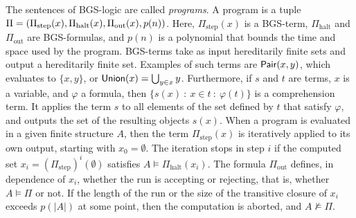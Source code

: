 \documentclass[a4paper,UKenglish,cleveref, autoref, thm-restate]{lipics-v2021}
\renewcommand{\phi}{\varphi}
\renewcommand{\phi}{\varphi}
\newcommand{\Pair}{\textsf{\upshape Pair}}
\newcommand{\Union}{\textsf{\upshape Union}}
\begin{document}
	The sentences of BGS-logic are called \emph{programs}. A program is a tuple $\Pi = (\Pi_{\text{step}}(x),\\ \Pi_{\text{halt}}(x),\Pi_{\text{out}}(x),p(n))$. Here, $\Pi_{\text{step}}(x)$ is a BGS-term, $\Pi_{\text{halt}}$ and $\Pi_{\text{out}}$ are BGS-formulas, and $p(n)$ is a polynomial that bounds the time and space used by the program. BGS-terms take as input hereditarily finite sets and output a hereditarily finite set. Examples of such terms are $\Pair(x,y)$, which evaluates to $\{x,y\}$, or $\Union(x) = \bigcup_{y \in x} y$. Furthermore, if $s$ and $t$ are terms, $x$ is a variable, and $\phi$ a formula, then $\{ s(x) \ : \ x \in t \ : \ \phi(t) \}$ is a comprehension term. It applies the term $s$ to all elements of the set defined by $t$ that satisfy $\phi$, and outputs the set of the resulting objects $s(x)$. When a program is evaluated in a given finite structure $A$, then the term $\Pi_{\text{step}}(x)$ is iteratively applied to its own output, starting with $x_0 = \emptyset$. The iteration stops in step $i$ if the computed set $x_i = (\Pi_{\text{step}})^i(\emptyset)$ satisfies $A \models \Pi_{\text{halt}}(x_i)$. The formula $\Pi_{\text{out}}$ defines, in dependence of $x_i$, whether the run is accepting or rejecting, that is, whether $A \models \Pi$ or not. If the length of the run or the size of the transitive closure of $x_i$ exceeds $p(|A|)$ at some point, then the computation is aborted, and $A \not\models \Pi$.\\
	
\end{document}
